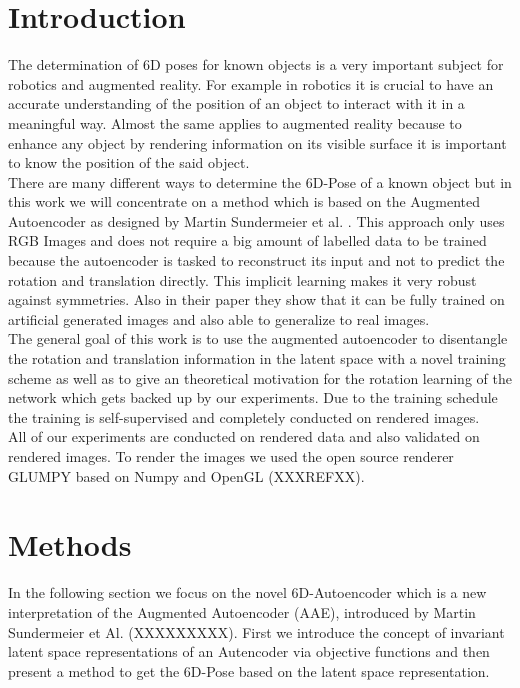 \documentclass[10pt,a4paper]{article}
\begin{document}
\section{Introduction}\label{Introduction}
The determination of 6D poses for known objects is a very important subject for robotics and augmented reality. For example in robotics it is crucial to have an accurate understanding of the position of an object to interact with it in a meaningful way. Almost the same applies to augmented reality because to enhance any object by rendering information on its visible surface it is important to know the position of the said object.\\
There are many different ways to determine the 6D-Pose of a known object but in this work we will concentrate on a method which is based on the Augmented Autoencoder as designed by Martin Sundermeier et al. \cite{3D_Orientation_Learning}. This approach only uses RGB Images and does not require a big amount of labelled data to be trained because the autoencoder is tasked to reconstruct its input and not to predict the rotation and translation directly. This implicit learning makes it very robust against symmetries. Also in their paper they show that it can be fully trained on artificial generated images and also able to generalize to real images.\\
The general goal of this work is to use the augmented autoencoder to disentangle the rotation and translation information in the latent space with a novel training scheme as well as to give an theoretical motivation for the rotation learning of the network which gets backed up by our experiments. Due to the training schedule the training is self-supervised and completely conducted on rendered images.\\
All of our experiments are conducted on rendered data and also validated on rendered images. To render the images we used the open source renderer GLUMPY based on Numpy and OpenGL (XXXREFXX). \\  




\newpage

\section{Methods}\label{Methods}
In the following section we focus on the novel 6D-Autoencoder which is a new interpretation of the Augmented Autoencoder (AAE), introduced by Martin Sundermeier et Al. (XXXXXXXXX). First we introduce the concept of invariant latent space representations of an Autencoder via objective functions and then present a method to get the 6D-Pose based on the latent space representation.
\end{document}
